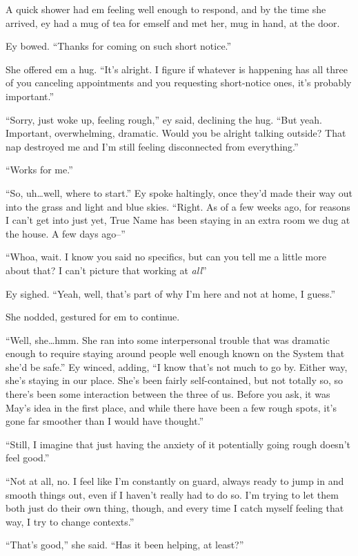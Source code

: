 A quick shower had em feeling well enough to respond, and by the time she arrived, ey had a mug of tea for emself and met her, mug in hand, at the door.

Ey bowed. ``Thanks for coming on such short notice.''

She offered em a hug. ``It's alright. I figure if whatever is happening has all three of you canceling appointments and you requesting short-notice ones, it's probably important.''

``Sorry, just woke up, feeling rough,'' ey said, declining the hug. ``But yeah. Important, overwhelming, dramatic. Would you be alright talking outside? That nap destroyed me and I'm still feeling disconnected from everything.''

``Works for me.''

``So, uh\ldots well, where to start.'' Ey spoke haltingly, once they'd made their way out into the grass and light and blue skies. ``Right. As of a few weeks ago, for reasons I can't get into just yet, True Name has been staying in an extra room we dug at the house. A few days ago--''

``Whoa, wait. I know you said no specifics, but can you tell me a little more about that? I can't picture that working at \emph{all}''

Ey sighed. ``Yeah, well, that's part of why I'm here and not at home, I guess.''

She nodded, gestured for em to continue.

``Well, she\ldots hmm. She ran into some interpersonal trouble that was dramatic enough to require staying around people well enough known on the System that she'd be safe.'' Ey winced, adding, ``I know that's not much to go by. Either way, she's staying in our place. She's been fairly self-contained, but not totally so, so there's been some interaction between the three of us. Before you ask, it was May's idea in the first place, and while there have been a few rough spots, it's gone far smoother than I would have thought.''

``Still, I imagine that just having the anxiety of it potentially going rough doesn't feel good.''

``Not at all, no. I feel like I'm constantly on guard, always ready to jump in and smooth things out, even if I haven't really had to do so. I'm trying to let them both just do their own thing, though, and every time I catch myself feeling that way, I try to change contexts.''

``That's good,'' she said. ``Has it been helping, at least?''


